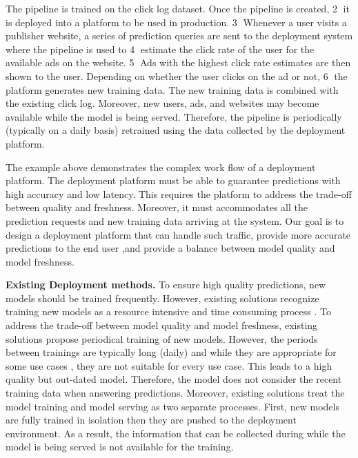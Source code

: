 The pipeline is trained on the click log dataset.
Once the pipeline is created, \textcircled{2} it is deployed into a platform to be used in production.
\textcircled{3} Whenever a user visits a publisher website, a series of prediction queries are sent to the deployment system where the pipeline is used to \textcircled{4} estimate the click rate of the user for the available ads on the website.
\textcircled{5} Ads with the highest click rate estimates are then shown to the user.
Depending on whether the user clicks on the ad or not, \textcircled{6} the platform generates new training data.
The new training data is combined with the existing click log.
Moreover, new users, ads, and websites may become available while the model is being served.
Therefore, the pipeline is periodically (typically on a daily basis) retrained using the data collected by the deployment platform.

The example above demonstrates the complex work flow of a deployment platform.
The deployment platform must be able to guarantee predictions with high accuracy and low latency.
This requires the platform to address the trade-off between quality and freshness.
Moreover, it must accommodates all the prediction requests and new training data arriving at the system. 
Our goal is to design a deployment platform that can handle such traffic, provide more accurate predictions to the end user ,and provide a balance between model quality and model freshness.

\textbf{Existing Deployment methods.} 
To ensure high quality predictions, new models should be trained frequently.
However, existing solutions recognize training new models as a resource intensive and time consuming process \cite{crankshaw2014missing, agarwal2014laser, baylor2017tfx}.
To address the trade-off between model quality and model freshness, existing solutions propose periodical training of new models.
However, the periods between trainings are typically long (daily) and while they are appropriate for some use cases \cite{baylor2017tfx}, they are not suitable for every use case.
This leads to a high quality but out-dated model.
Therefore, the model does not consider the recent training data when answering predictions.
Moreover, existing solutions treat the model training and model serving as two separate processes. 
First, new models are fully trained in isolation then they are pushed to the deployment environment.
As a result, the information that can be collected during while the model is being served is not available for the training. 

